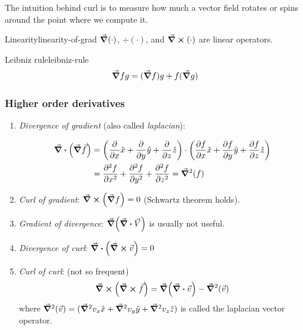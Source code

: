 \documentclass[12pt]{extarticle}
\begin{document}
The intuition behind curl is to measure how much a vector field rotates or spins around the point where we compute it.

\begin{proposition}{Linearity}{linearity-of-grad}
	$\grad(\mathord{\cdot})$, $\div(\mathord{\cdot})$, and $\curl(\mathord{\cdot})$ are linear operators.
\end{proposition}

\begin{proposition}{Leibniz rule}{leibniz-rule}
	\begin{equation}
		\grad{fg} = (\grad f)g + f (\grad g)
	\end{equation}
\end{proposition}

\subsubsection{Higher order derivatives}
\label{sec:higher-order-derivatives}

\begin{enumerate}
	\item \textit{Divergence of gradient}
	      (also called \textit{laplacian}):

	      \begin{align}
		      \div (\grad \vec f) & = \left( \pdv{}{x} \hat{x} + \pdv{}{y} \hat{y} + \pdv{}{z} \hat{z} \right) \cdot \left( \pdv{f}{x} \hat{x} + \pdv{f}{y} \hat{y} + \pdv{f}{z} \hat{z} \right) \\
		                          & = \pdv[2]{f}{x} + \pdv[2]{f}{y} + \pdv[2]{f}{z} = \grad^2(f)
	      \end{align}

	\item \textit{Curl of gradient}: $\curl(\grad f) = 0$ (Schwartz theorem holds).
	\item \textit{Gradient of divergence}: $\grad (\div \vec V)$ is usually not useful.
	\item \textit{Divergence of curl}: $\div (\curl \vec v) = 0$
	\item \textit{Curl of curl}: (not so frequent)
	      \begin{equation}
		      \curl (\curl \vec f) = \grad (\div \vec v) - \grad^2(\vec v)
	      \end{equation}
	      where $\grad^2(\vec v) = (\grad^2 v_x \hat x + \grad^2 v_y \hat y + \grad^2 v_z \hat z)$ is called the laplacian vector operator.
\end{enumerate}
\end{document}
